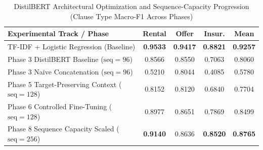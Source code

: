 \begin{table}[t]
\centering
\caption{DistilBERT Architectural Optimization and Sequence-Capacity Progression (Clause Type Macro-F1 Across Phases)}
\label{tab:ablation}
\footnotesize
\setlength{\tabcolsep}{3.5pt}
\begin{tabular}{l ccc c}
\toprule
\textbf{Experimental Track / Phase} & \textbf{Rental} & \textbf{Offer} & \textbf{Insur.} & \textbf{Mean} \\
\midrule
TF-IDF + Logistic Regression (Baseline) & \textbf{0.9533} & \textbf{0.9417} & \textbf{0.8821} & \textbf{0.9257} \\
Phase 3 DistilBERT Baseline ($\text{seq}=96$) & 0.8566 & 0.8550 & 0.7063 & 0.8060 \\
Phase 3 Naive Concatenation ($\text{seq}=96$) & 0.5210 & 0.8044 & 0.4085 & 0.5780 \\
Phase 5 Target-Preserving Context ($\text{seq}=128$) & 0.8152 & 0.8120 & 0.6840 & 0.7704 \\
Phase 6 Controlled Fine-Tuning ($\text{seq}=128$) & 0.8977 & 0.8651 & 0.7869 & 0.8499 \\
Phase 8 Sequence Capacity Scaled ($\text{seq}=256$) & \textbf{0.9140} & 0.8636 & \textbf{0.8520} & \textbf{0.8765} \\
\bottomrule
\end{tabular}
\end{table}

